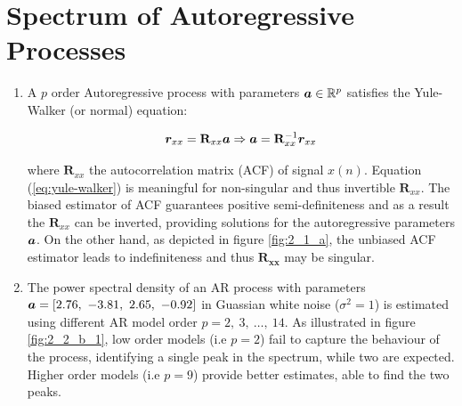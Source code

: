 \section{Spectrum of Autoregressive Processes}

\begin{enumerate}[label=\alph*), leftmargin=*]
\item
%

A $p$ order Autoregressive process with parameters ${\bm{a}} \in {\mathbb{R}}^{p}$ satisfies the Yule-Walker (or normal) equation:

\begin{equation}
    {\bm{r}}_{xx} = \mathbf{R}_{xx} {\bm{a}} \Rightarrow {\bm{a}} = \mathbf{R}_{xx}^{-1} {\bm{r}}_{xx}
    \label{eq:yule-walker}
\end{equation}

where $\mathbf{R}_{xx}$ the autocorrelation matrix (ACF) of signal $x(n)$. Equation (\ref{eq:yule-walker}) is meaningful for non-singular and thus invertible $\mathbf{R}_{xx}$.
The biased estimator of ACF guarantees positive semi-definiteness and as a result the $\mathbf{R}_{xx}$ can be inverted, providing solutions for the autoregressive parameters ${\bm{a}}$.
On the other hand, as depicted in figure \ref{fig:2_1_a}, the unbiased ACF estimator leads to indefiniteness and thus $\mathbf{R_{xx}}$ may be singular.

\item
%

The power spectral density of an AR process with parameters ${\bm{a}} = [2.76,\ -3.81,\ 2.65,\ -0.92]$ in Guassian white noise ($\sigma^{2} = 1$) is estimated using different AR model order
$p = 2,\ 3,\ \ldots,\ 14$. As illustrated in figure \ref{fig:2_2_b_1}, low order models (i.e $p=2$) fail to capture the behaviour of the process, identifying a single peak in the spectrum,
while two are expected. Higher order models (i.e $p=9$) provide better estimates, able to find the two peaks.


\end{enumerate}
